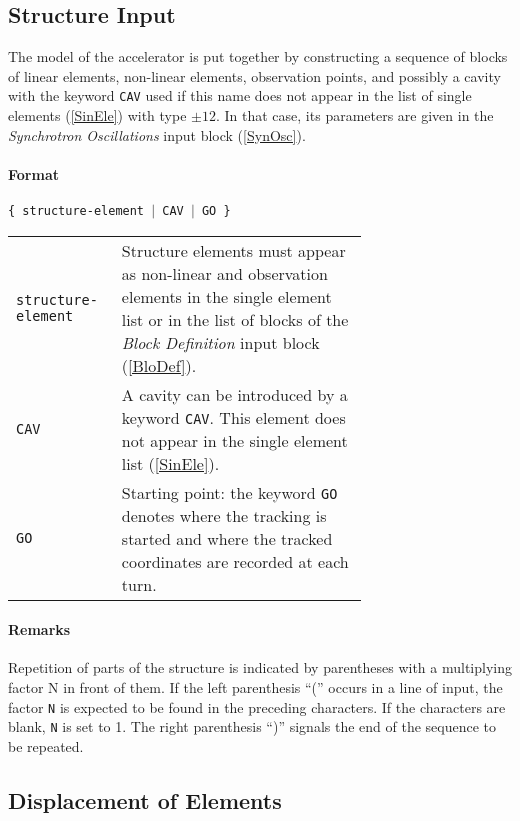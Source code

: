\subsection{Structure Input} \label{StrInp}

The model of the accelerator is put together by constructing a sequence of blocks of linear elements, non-linear elements, observation points, and possibly a cavity with the keyword \texttt{CAV} used if this name does not appear in the list of single elements (\ref{SinEle}) with type $\pm 12$.
In that case, its parameters are given in the \textit{Synchrotron Oscillations} input block (\ref{SynOsc}).

\paragraph{Format} \texttt{\{ structure-element $\vert$ CAV $\vert$ GO \}}

\bigskip
\begin{longtabu}{@{}lp{0.70\linewidth}}
    \texttt{structure-element} & Structure elements must appear as non-linear and observation elements in the single element list or in the list of blocks of the \textit{Block Definition} input block (\ref{BloDef}). \\
    \texttt{CAV} & A cavity can be introduced by a keyword \texttt{CAV}. This element does not appear in the single element list   (\ref{SinEle}). \\
    \texttt{GO} & Starting point: the keyword \texttt{GO} denotes where the tracking is started and where the tracked coordinates are recorded at each turn.
\end{longtabu}

\paragraph{Remarks}
Repetition of parts of the structure is indicated by parentheses with a multiplying factor N in front of them.
If the left parenthesis ``('' occurs in a line of input, the factor \texttt{N} is expected to be found in the preceding characters.
If the characters are blank, \texttt{N} is set to 1.
The right parenthesis ``)'' signals the end of the sequence to be repeated.

\subsection{Displacement of Elements} \label{DisEle}

